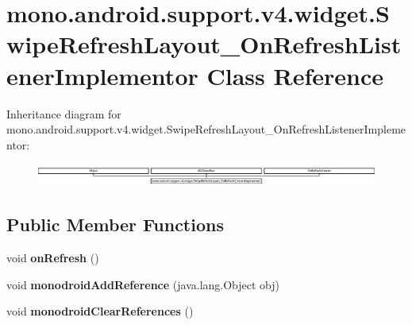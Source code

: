 \hypertarget{classmono_1_1android_1_1support_1_1v4_1_1widget_1_1SwipeRefreshLayout__OnRefreshListenerImplementor}{}\section{mono.\+android.\+support.\+v4.\+widget.\+Swipe\+Refresh\+Layout\+\_\+\+On\+Refresh\+Listener\+Implementor Class Reference}
\label{classmono_1_1android_1_1support_1_1v4_1_1widget_1_1SwipeRefreshLayout__OnRefreshListenerImplementor}
Inheritance diagram for mono.\+android.\+support.\+v4.\+widget.\+Swipe\+Refresh\+Layout\+\_\+\+On\+Refresh\+Listener\+Implementor\+:\begin{figure}[H]
\begin{center}
\leavevmode
\includegraphics[height=0.745176cm]{classmono_1_1android_1_1support_1_1v4_1_1widget_1_1SwipeRefreshLayout__OnRefreshListenerImplementor}
\end{center}
\end{figure}
\subsection*{Public Member Functions}
\begin{DoxyCompactItemize}
\item 
\mbox{\label{classmono_1_1android_1_1support_1_1v4_1_1widget_1_1SwipeRefreshLayout__OnRefreshListenerImplementor_a74f3896d97f8baf7046389f758407a1c}} 
void {\bfseries on\+Refresh} ()
\item 
\mbox{\label{classmono_1_1android_1_1support_1_1v4_1_1widget_1_1SwipeRefreshLayout__OnRefreshListenerImplementor_a422bf9708796c9a0bcaaec2137d8200a}} 
void {\bfseries monodroid\+Add\+Reference} (java.\+lang.\+Object obj)
\item 
\mbox{\label{classmono_1_1android_1_1support_1_1v4_1_1widget_1_1SwipeRefreshLayout__OnRefreshListenerImplementor_a2669d5c1b40a370723a749b9aa381407}} 
void {\bfseries monodroid\+Clear\+References} ()
\end{DoxyCompactItemize}
